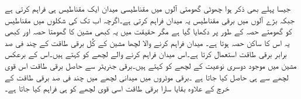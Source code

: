 جیسا پہلے بھی ذکر ہوا چھوٹی گھومتی آلوں میں مقناطیسی میدان ایک مقناطیس ہی فراہم کرتی ہے جبکہ بڑے آلوں میں برقی مقناطیس یہ میدان فراہم کرتی ہے۔اگرچہ اب تک کی شکلوں میں مقناطیس کو گھومتے حصہ کے طور پر دکھایا گیا ہے مگر حقیقت میں یہ کبھی مشین کا گھومتا حصہ اور کبھی یہ اس کا ساکن حصہ ہوتا ہے۔ میدان فراہم کرنے والا لچھا مشین کے کُل برقی طاقت کے چند فی صد برابر برقی طاقت استعمال کرتا ہے۔اس  میدان فراہم کرنے والے لچھے کو   کہتے ہیں۔اس کے برعکس مشین میں موجود دوسری نوعیت کے لچھے کو   کہتے ہیں۔برقی جنریٹر سے حاصل برقی طاقت اس قوی لچھے سے ہی حاصل کیا جاتا ہے ۔برقی موٹروں میں میدانی لچھے میں چند فی صد برقی طاقت کے خرچ کے علاوہ بقایا سارا برقی طاقت اسی قوی لچھے کو ہی فراہم کیا جاتا ہے۔
\begin{figure}
\centering
\end{figure}
